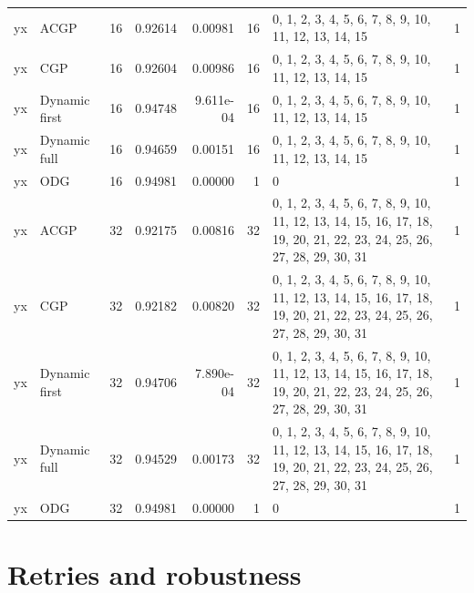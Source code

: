 \documentclass[10pt,a4paper]{article}
\begin{document}
\begin{longtable}{@{}p{23mm}p{29mm}rrrrp{36mm}r@{}}
yx & ACGP & 16 & 0.92614 & 0.00981 & 16 & 0, 1, 2, 3, 4, 5, 6, 7, 8, 9, 10, 11, 12, 13, 14, 15 & 1 \\
yx & CGP & 16 & 0.92604 & 0.00986 & 16 & 0, 1, 2, 3, 4, 5, 6, 7, 8, 9, 10, 11, 12, 13, 14, 15 & 1 \\
yx & Dynamic first & 16 & 0.94748 & 9.611e-04 & 16 & 0, 1, 2, 3, 4, 5, 6, 7, 8, 9, 10, 11, 12, 13, 14, 15 & 1 \\
yx & Dynamic full & 16 & 0.94659 & 0.00151 & 16 & 0, 1, 2, 3, 4, 5, 6, 7, 8, 9, 10, 11, 12, 13, 14, 15 & 1 \\
yx & ODG & 16 & 0.94981 & 0.00000 & 1 & 0 & 1 \\
yx & ACGP & 32 & 0.92175 & 0.00816 & 32 & 0, 1, 2, 3, 4, 5, 6, 7, 8, 9, 10, 11, 12, 13, 14, 15, 16, 17, 18, 19, 20, 21, 22, 23, 24, 25, 26, 27, 28, 29, 30, 31 & 1 \\
yx & CGP & 32 & 0.92182 & 0.00820 & 32 & 0, 1, 2, 3, 4, 5, 6, 7, 8, 9, 10, 11, 12, 13, 14, 15, 16, 17, 18, 19, 20, 21, 22, 23, 24, 25, 26, 27, 28, 29, 30, 31 & 1 \\
yx & Dynamic first & 32 & 0.94706 & 7.890e-04 & 32 & 0, 1, 2, 3, 4, 5, 6, 7, 8, 9, 10, 11, 12, 13, 14, 15, 16, 17, 18, 19, 20, 21, 22, 23, 24, 25, 26, 27, 28, 29, 30, 31 & 1 \\
yx & Dynamic full & 32 & 0.94529 & 0.00173 & 32 & 0, 1, 2, 3, 4, 5, 6, 7, 8, 9, 10, 11, 12, 13, 14, 15, 16, 17, 18, 19, 20, 21, 22, 23, 24, 25, 26, 27, 28, 29, 30, 31 & 1 \\
yx & ODG & 32 & 0.94981 & 0.00000 & 1 & 0 & 1 \\
\end{longtable}\normalsize\setlength{\tabcolsep}{6pt}
\clearpage
\section*{Retries and robustness}
\clearpage
\end{document}
